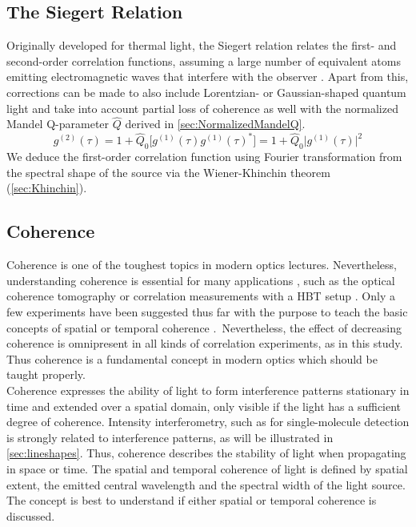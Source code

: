 \subsection{The Siegert Relation}\label{sec:siegert}
Originally developed for thermal light, the Siegert relation relates the first- and second-order correlation functions, assuming a large number of equivalent atoms emitting electromagnetic waves that interfere with the observer \cite{classen_incoherent_2017}. Apart from this, corrections can be made to also include Lorentzian- or Gaussian-shaped quantum light and take into account partial loss of coherence as well \cite{classen_incoherent_2017,ann_observation_2019,ferreira_connecting_2020} with the normalized Mandel Q-parameter $\hat{Q}$ derived in \cref{sec:NormalizedMandelQ}.
\begin{equation}\label{eq:siegert}
	g^{(2)}(\tau)=1+\hat{Q}_0\Big[g^{(1)}(\tau)g^{(1)}(\tau)^{*}\Big]=1+\hat{Q}_0\Big|g^{(1)}(\tau)\Big|^2
\end{equation}
We deduce the first-order correlation function using Fourier transformation from the spectral shape of the source via the Wiener-Khinchin theorem (\cref{sec:Khinchin}).

\subsection{Coherence}\label{sec:coherence}
Coherence is one of the toughest topics in modern optics lectures. Nevertheless, understanding coherence is essential for many applications \cite{pieper_visualizing_2019}, such as the optical coherence tomography \cite{tomlins_theory_2005} or correlation measurements with a \ac{HBT} setup \cite{hanbury_brown_test_1956}. Only a few experiments have been suggested thus far with the purpose to teach the basic concepts of spatial \cite{basano_simple_1996,jackson_subtleties_2018} or temporal coherence \cite{millet_undergraduate_1971}.~Nevertheless, the effect of decreasing coherence is omnipresent in all kinds of correlation experiments, as in this study. Thus coherence is a fundamental concept in modern optics which should be taught properly.\\
Coherence expresses the ability of light to form interference patterns stationary in time and extended over a spatial domain, only visible if the light has a sufficient degree of coherence. Intensity interferometry, such as for single-molecule detection is strongly related to interference patterns, as will be illustrated in \cref{sec:lineshapes}. Thus, coherence describes the stability of light \cite{fox_quantum_2006} when propagating in space or time. 
The spatial and temporal coherence of light is defined by spatial extent, the emitted central wavelength and the spectral width of the light source. The concept is best to understand if either spatial or temporal coherence is discussed.

